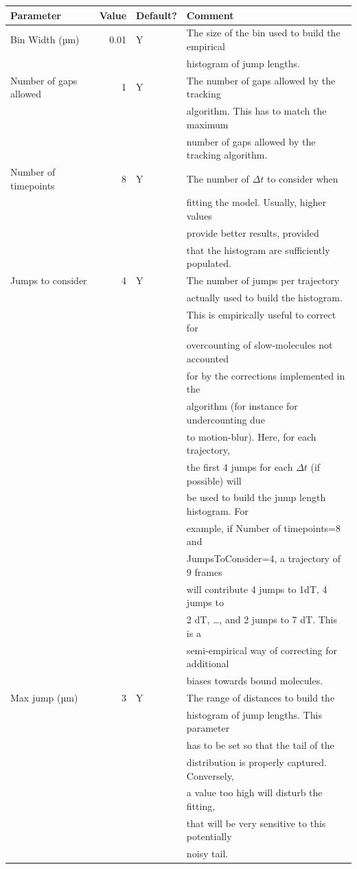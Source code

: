 \begin{center}
  \label{table:table4}
\begin{tabular}{lrll}
  Parameter & Value & Default? & Comment\\
  \hline
  Bin Width (µm) & 0.01 & Y & The size of the bin used to build the empirical \\&&&histogram of jump lengths.\\
  Number of gaps allowed & 1 & Y & The number of gaps allowed by the tracking \\&&&algorithm. This has to match the maximum \\&&&number of gaps allowed by the tracking algorithm.\\
  Number of timepoints & 8 & Y & The number of \(\Delta t\) to consider when \\&&&fitting the model. Usually, higher values \\&&&provide better results, provided \\&&&that the histogram are sufficiently populated.\\
  Jumps to consider & 4 & Y & The number of jumps per trajectory \\&&&actually used to build the histogram. \\&&&This is empirically useful to correct for \\&&&overcounting of slow-molecules not accounted \\&&&for by the corrections implemented in the \\&&&algorithm (for instance for undercounting due \\&&&to motion-blur). Here, for each trajectory, \\&&&the first 4 jumps for each \(\Delta t\) (if possible) will \\&&&be used to build the jump length histogram. For \\&&&example, if Number of timepoints=8 and \\&&&JumpsToConsider=4, a trajectory of 9 frames \\&&&will contribute 4 jumps to 1dT, 4 jumps to \\&&&2 dT, \dots, and 2 jumps to 7 dT. This is a \\&&&semi-empirical way of correcting for additional \\&&&biases towards bound molecules.\\
  Max jump (µm) & 3 & Y & The range of distances to build the \\&&&histogram of jump lengths. This parameter \\&&&has to be set so that the tail of the \\&&&distribution is properly captured. Conversely, \\&&&a value too high will disturb the fitting, \\&&&that will be very sensitive to this potentially \\&&&noisy tail.
\end{tabular}
\end{center}

